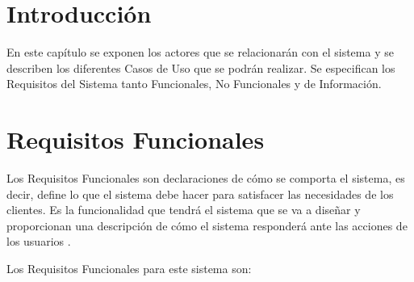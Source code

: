 \section{Introducción}
En este capítulo se exponen los actores que se relacionarán con el sistema y se describen los diferentes Casos de Uso que se podrán realizar. Se especifican los Requisitos del Sistema tanto Funcionales, No Funcionales y de Información.


\section{Requisitos Funcionales}

Los Requisitos Funcionales son declaraciones de cómo se comporta el sistema, es decir, define lo que el sistema debe hacer para satisfacer las necesidades de los clientes. Es la funcionalidad que tendrá el sistema que se va a diseñar y proporcionan una descripción de cómo el sistema responderá ante las acciones de los usuarios \cite{requisitos}.

Los Requisitos Funcionales para este sistema son: 

